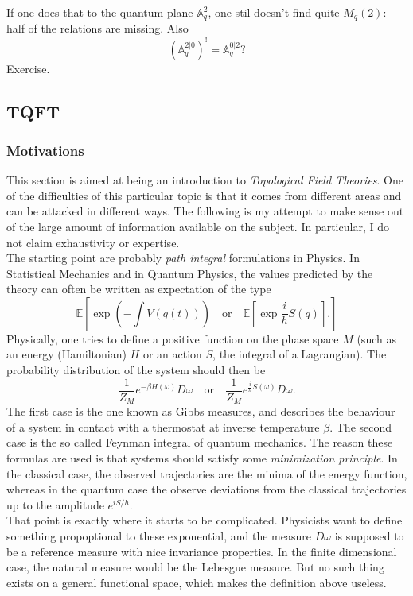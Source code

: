If one does that to the quantum plane $\mathbb A_q^2$, one stil doesn't find quite $M_q(2)$: half of the relations are missing. Also 
\[(\mathbb A_q^{2|0})^! = \mathbb A_q^{0|2}?\] Exercise.

\subsection{TQFT}

\subsubsection{Motivations}

This section is aimed at being an introduction to \textit{Topological Field Theories}. One of the difficulties of this particular topic is that it comes from different areas and can be attacked in different ways. The following is my attempt to make sense out of the large amount of information available on the subject. In particular, I do not claim exhaustivity or expertise.\\

The starting point are probably \textit{path integral} formulations in Physics. In Statistical Mechanics and in Quantum Physics, the values predicted by the theory can often be written as expectation of the type
\[\mathbb E[\exp (-\int V(q(t))) \quad \text{or} \quad \mathbb E [\exp \frac{i}{h} S(q)] .]\]
Physically, one tries to define a positive function on the phase space $M$ (such as an energy (Hamiltonian) $H$ or an action $S$, the integral of a Lagrangian). The probability distribution of the system should then be
\[\frac{1}{Z_M}e^{-\beta H(\omega)} D\omega \quad \text{or}\quad \frac{1}{Z_M}e^{\frac{i}{h}S(\omega)} D\omega .\]
The first case is the one known as Gibbs measures, and describes the behaviour of a system in contact with a thermostat at inverse temperature $\beta$. The second case is the so called Feynman integral of quantum mechanics. The reason these formulas are used is that systems should satisfy some \textit{minimization principle}. In the classical case, the observed trajectories are the minima of the energy function, whereas in the quantum case the observe deviations from the classical trajectories up to the amplitude $e^{iS/h}$.\\ 

That point is exactly where it starts to be complicated. Physicists want to define something propoptional to these exponential, and the measure $D\omega$ is supposed to be a reference measure with nice invariance properties. In the finite dimensional case, the natural measure would be the Lebesgue measure. But no such thing exists on a general functional space, which makes the definition above useless.\\  

